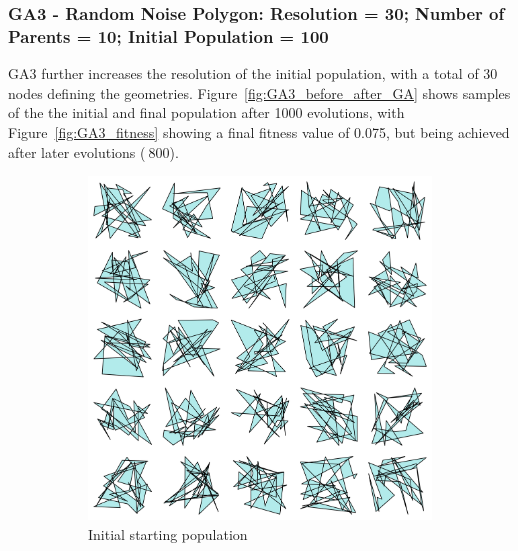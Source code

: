 \documentclass{article}
\begin{document}
\subsubsection*{GA3 - Random Noise Polygon: Resolution = 30; Number of Parents = 10; Initial Population = 100}
GA3 further increases the resolution of the initial population, with a total of 30 nodes defining the geometries. Figure~\ref{fig:GA3_before_after_GA} shows samples of the the initial and final population after 1000 evolutions, with Figure~\ref{fig:GA3_fitness} showing a final fitness value of 0.075, but being achieved after later evolutions ($~800$).
\begin{figure}[H]
    \centering
    \begin{subfigure}[b]{0.45\textwidth}
        \centering
        \includegraphics[width=\textwidth]{figures/GAResults/GA3/30point_initial_pop.png}
        \caption{Initial starting population}
        \label{fig:GA3_starting}
    \end{subfigure}
    \hfill
    \begin{subfigure}[b]{0.45\textwidth}
        \centering

\end{subfigure}
\end{figure}
\end{document}
